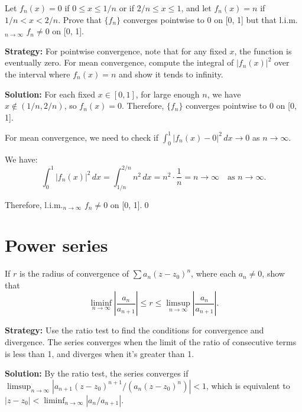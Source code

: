 \begin{problembox}
Let \( f_n(x) = 0 \) if \( 0 \leq x \leq 1/n \) or if \( 2/n \leq x \leq 1 \), and let \( f_n(x) = n \) if \( 1/n < x < 2/n \). Prove that \( \{f_n\} \) converges pointwise to 0 on [0, 1] but that l.i.m.\(_{n\to\infty}\) \( f_n \neq 0 \) on [0, 1].
\end{problembox}

\noindent\textbf{Strategy:} For pointwise convergence, note that for any fixed \( x \), the function is eventually zero. For mean convergence, compute the integral of \( |f_n(x)|^2 \) over the interval where \( f_n(x) = n \) and show it tends to infinity.

\bigskip\noindent\textbf{Solution:} For each fixed \( x \in [0, 1] \), for large enough \( n \), we have \( x \notin (1/n, 2/n) \), so \( f_n(x) = 0 \). Therefore, \( \{f_n\} \) converges pointwise to 0 on [0, 1].

For mean convergence, we need to check if \( \int_0^1 |f_n(x) - 0|^2 \, dx \to 0 \) as \( n \to \infty \).

We have:
\[\int_0^1 |f_n(x)|^2 \, dx = \int_{1/n}^{2/n} n^2 \, dx = n^2 \cdot \frac{1}{n} = n \to \infty \quad \text{as } n \to \infty.\]

Therefore, l.i.m.\(_{n\to\infty}\) \( f_n \neq 0 \) on [0, 1].\qed
\section{Power series}



\begin{problembox}
If \( r \) is the radius of convergence of \( \sum a_n(z - z_0)^n \), where each \( a_n \neq 0 \), show that
\[ \liminf_{n\to\infty} \left| \frac{a_n}{a_{n+1}} \right| \leq r \leq \limsup_{n\to\infty} \left| \frac{a_n}{a_{n+1}} \right|.\]
\end{problembox}

\noindent\textbf{Strategy:} Use the ratio test to find the conditions for convergence and divergence. The series converges when the limit of the ratio of consecutive terms is less than 1, and diverges when it's greater than 1.

\bigskip\noindent\textbf{Solution:} By the ratio test, the series converges if \( \limsup_{n\to\infty} |a_{n+1}(z - z_0)^{n+1} / (a_n(z - z_0)^n)| < 1 \), which is equivalent to \( |z - z_0| < \liminf_{n\to\infty} |a_n/a_{n+1}| \).

